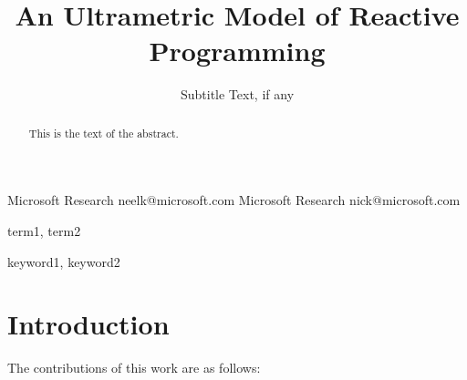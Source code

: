 \documentclass[preprint]{sigplanconf}
\begin{document}
\copyrightdata{[to be supplied]} 


\title{An Ultrametric Model of Reactive Programming}
\subtitle{Subtitle Text, if any}

           {Microsoft Research}
           {neelk@microsoft.com}
           {Microsoft Research}
           {nick@microsoft.com}

\maketitle

\begin{abstract}
This is the text of the abstract.
\end{abstract}

\newtheorem{prop}{Proposition}
\newtheorem{lemma}{Lemma}


\terms
term1, term2

\keywords
keyword1, keyword2

\section{Introduction}

The contributions of this work are as follows:
\end{document}
